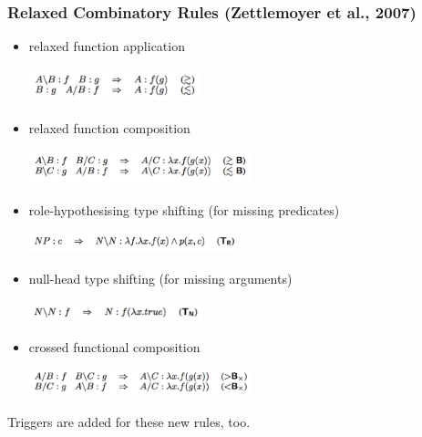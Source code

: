 \documentclass{beamer}
\begin{document}
\begin{frame}
    \frametitle{Relaxed Combinatory Rules (Zettlemoyer et al., 2007)}

    \begin{itemize}
        \item relaxed function application

            \includegraphics[height=1cm,width=5cm]{img/ccg-relax-01.png}

        \item relaxed function composition

            \includegraphics[height=1cm,width=6.5cm]{img/ccg-relax-02.png}

        \item role-hypothesising type shifting (for missing predicates)

            \includegraphics[height=0.6cm,width=6cm]{img/ccg-relax-03.png}

        \item null-head type shifting (for missing arguments)

            \includegraphics[height=0.6cm,width=5cm]{img/ccg-relax-04.png}

        \item crossed functional composition

            \includegraphics[height=0.8cm,width=6.5cm]{img/ccg-relax-05.png}
    \end{itemize}

    Triggers are added for these new rules, too.

\end{frame}
\end{document}
